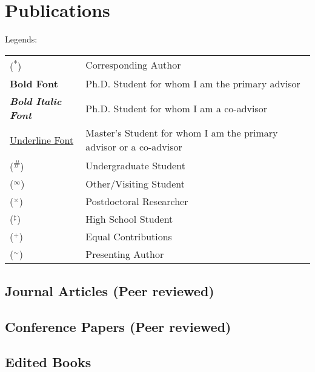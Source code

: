 \documentclass[letterpaper, 12pt]{extarticle}
\begin{document}
\section{Publications}%
Legends:

\begin{tabular}{p{}p{}}
	(\textsuperscript{*})              & Corresponding Author                               \\
	\textbf{Bold Font}                 & Ph.D. Student for whom I am the primary advisor    \\
	\textbf{\textit{Bold Italic Font}} & Ph.D. Student for whom I am a co-advisor           \\
	\underline{Underline Font}         & Master's Student for whom I am the primary advisor
	or a co-advisor                                                                         \\
	(\textsuperscript{\#})             & Undergraduate Student                              \\
	($^\infty$)                        & Other/Visiting Student                             \\
	($^\times$)                        & Postdoctoral Researcher                            \\
	($^\ddagger$)                      & High School Student                                \\
	($^+$)                             & Equal Contributions                                \\
	($^\sim$)                          & Presenting Author                                  \\
\end{tabular}
\nocite{*}
\subsection{Journal Articles (Peer reviewed)}%
\printbibliography[heading=none, type=article, resetnumbers=true]

\subsection{Conference Papers (Peer reviewed)}%
\printbibliography[heading=none, type=inproceedings, notkeyword=podium]

\subsection{Edited Books}%
\printbibliography[heading=none, type=book]
\end{document}
